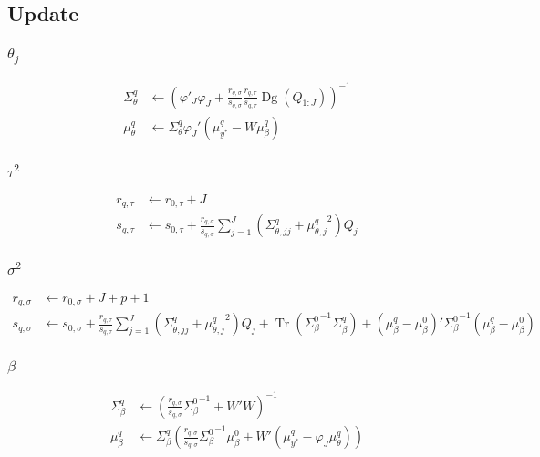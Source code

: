 \documentclass[11pt]{article}
\DeclareMathOperator{\Tr}{Tr}
\newcommand{\opn}{\operatorname}
\begin{document}
\subsection{Update}
\subsubsection{$\theta_{j}$}
\begin{align*}
  \Sigma_{\theta}^{q} &\leftarrow \left(\varphi'_{J}\varphi_{J} +\frac{r_{q,\sigma}}{s_{q,\sigma}}\frac{r_{q,\tau}}{s_{q,\tau}}\opn{Dg}\left(Q_{1:J}\right) \right)^{-1}\\
  \mu_{\theta}^{q} &\leftarrow \Sigma_{\theta}^{q}\varphi_{J}'\left(\mu_{y^{*}}^{q}-W\mu_{\beta}^{q}\right)
\end{align*}
\subsubsection{$\tau^{2}$}
\begin{align*}
  r_{q,\tau} &\leftarrow r_{0,\tau} +J\\
  s_{q,\tau} &\leftarrow s_{0,\tau} + \frac{r_{q,\sigma}}{s_{q,\sigma}}\sum_{j=1}^{J}\left(\Sigma_{\theta, jj}^{q}+{\mu_{\theta, j}^{q}}^{2}\right)Q_{j}
\end{align*}
\subsubsection{$\sigma^{2}$}
\begin{align*}
  r_{q,\sigma} &\leftarrow r_{0,\sigma} + J + p + 1\\
  s_{q,\sigma} &\leftarrow s_{0,\sigma} +\frac{r_{q,\tau}}{s_{q,\tau}}\sum_{j=1}^{J}\left(\Sigma_{\theta, jj}^{q}+{\mu_{\theta, j}^{q}}^{2}\right)Q_{j} + \Tr\left({\Sigma_{\beta}^{0}}^{-1}\Sigma_{\beta}^{q}\right) +\left(\mu_{\beta}^{q}-\mu_{\beta}^{0}\right)'{\Sigma_{\beta}^{0}}^{-1}\left(\mu_{\beta}^{q}-\mu_{\beta}^{0}\right)
\end{align*}
\subsubsection{$\beta$}
\begin{align*}
  \Sigma_{\beta}^{q} &\leftarrow \left(\frac{r_{q,\sigma}}{s_{q,\sigma}}{\Sigma_{\beta}^{0}}^{-1}+W'W \right)^{-1}\\
  \mu_{\beta}^{q} &\leftarrow \Sigma_{\beta}^{q}\left(\frac{r_{q,\sigma}}{s_{q,\sigma}}{\Sigma_{\beta}^{0}}^{-1}\mu_{\beta}^{0}+W'\left(\mu_{y^*}^{q}-\varphi_{J}\mu_{\theta}^{q}\right)\right)
\end{align*}
\end{document}
